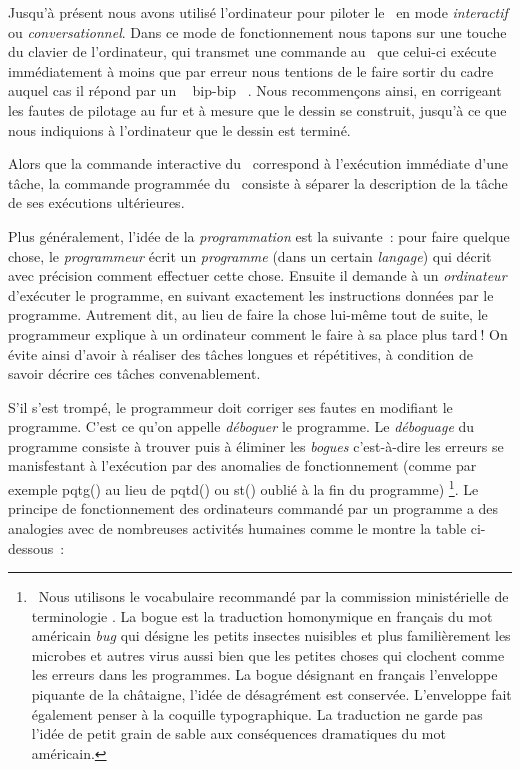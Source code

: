 
Jusqu'à présent nous avons utilisé l'ordinateur pour
piloter le \robot\ en mode {\em interactif} ou
{\em conversationnel}. Dans ce mode de fonctionnement 
nous tapons sur une touche du clavier de l'ordinateur, qui transmet
une commande au \robot\ que celui-ci exécute immédiatement à moins que par erreur
nous tentions de le faire sortir du cadre auquel cas il répond par
un \raisebox{0.25ex}{$\scriptscriptstyle \boldmath\ll$}~%
bip-bip%
~\raisebox{0.25ex}{$\scriptscriptstyle \boldmath\gg$}. 
Nous recommençons ainsi, en corrigeant les fautes de pilotage au fur et à mesure que
le dessin se construit, jusqu'à ce que nous
indiquions à l'ordinateur que le dessin est terminé. 

\smallskip

Alors que la commande interactive du \robot\ correspond à l'exécution
im\-mé\-dia\-te d'une tâche, la commande programmée du \robot\ consiste
à séparer la description de la tâche de ses exécutions ultérieures. 

\smallskip

Plus
généralement, l'idée de la {\em programmation} est la suivante~: 
pour faire quelque chose, le {\em programmeur} écrit un {\em programme}
(dans un certain {\em langage}) qui décrit avec précision comment 
effectuer cette chose. Ensuite il demande à un {\em ordinateur} d'exécuter
le programme, en suivant exactement les instructions données par le
programme. Autrement dit, au lieu de faire la chose
lui-même tout de suite, le programmeur explique à un ordinateur comment 
le faire à sa place plus tard$\:$! On évite ainsi d'avoir à réaliser
des tâches longues et répétitives, à condition de savoir 
décrire ces tâches con\-ve\-na\-ble\-ment.

\smallskip

S'il s'est trompé, le programmeur
doit corriger ses fautes en modifiant le programme. C'est ce qu'on appelle 
{\em déboguer} le programme. Le {\em déboguage}
du programme consiste à trouver puis à éliminer les {\em bogues} c'est-à-dire les 
erreurs se manisfestant à l'exécution par des anomalies de fonctionnement (comme par 
exemple {\idt pqtg()} au lieu de {\idt pqtd()} ou {\idt st()} oublié à la fin du programme)%
\footnote{\ Nous utilisons le vocabulaire recommandé par la commission
ministérielle de ter\-mi\-no\-lo\-gie \cite{terminologie-info}. La bogue est
la traduction homonymique en français du mot américain {\em bug} qui 
désigne les petits insectes nuisibles et plus familièrement les microbes 
et autres virus aussi bien que les petites choses qui clochent comme les erreurs 
dans les programmes. La bogue désignant en français l'enveloppe piquante
de la châtaigne, l'idée de désagrément est conservée. L'enveloppe fait
également penser à la coquille typographique. La traduction
ne garde pas l'idée de petit grain de sable aux conséquences dramatiques
du mot américain.}.
Le principe de fonctionnement des ordinateurs commandé par un programme a des 
analogies avec de nombreuses activités humaines
comme le montre la table \hbox{ci-dessous~:}

